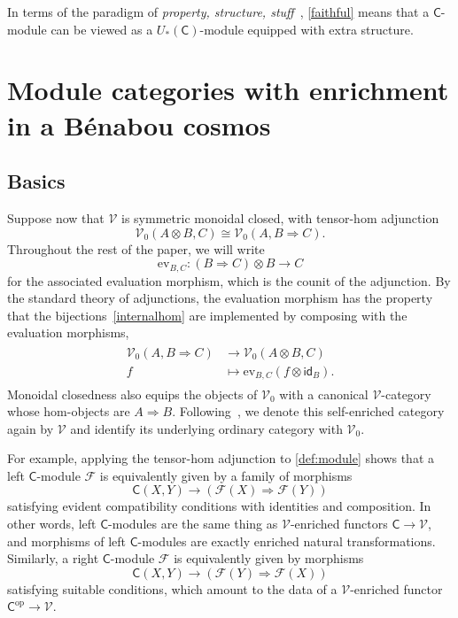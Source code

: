 \documentclass[11pt,onecolumn]{article}
\newcommand{\id}{\mathsf{id}}
\newcommand{\ev}{\mathrm{ev}}
\newcommand{\cV}{\mathscr{V}}
\newcommand{\cC}{\mathsf{C}}
\newcommand{\op}{\mathrm{op}}
\theoremstyle{plain}
\theoremstyle{remark}
\theoremstyle{definition}
\begin{document}
In terms of the paradigm of \emph{property, structure, stuff}~\cite[Section~2.4]{BS},
\cref{faithful} means that a $\cC$-module can be viewed as a $U_*(\cC)$-module equipped with extra structure.

\section{Module categories with enrichment in a B\'enabou cosmos}
\label{sec:cosmos_modules}

\subsection{Basics}
\label{rem:enriched_functor_category}

Suppose now that $\cV$ is symmetric monoidal closed, with tensor-hom adjunction
\begin{equation}
	\label{internalhom}
	\cV_0(A \otimes B, C) \cong \cV_0(A, B \Rightarrow C).
\end{equation}
Throughout the rest of the paper, we will write
\[
	\ev_{B, C} : (B \Rightarrow C) \otimes B \longrightarrow C
\]
for the associated evaluation morphism, which is the counit of the adjunction.
By the standard theory of adjunctions,
the evaluation morphism has the property that the bijections~\eqref{internalhom} are implemented by composing with the evaluation morphisms,
\begin{align}
	\label{internalhom_explicit}
	\begin{split}
		\cV_0(A, B \Rightarrow C) & \longrightarrow \cV_0(A \otimes B, C) \\
		f & \longmapsto \ev_{B,C} (f \otimes \id_B).
	\end{split}
\end{align}
Monoidal closedness also equips the objects of $\cV_0$ with a canonical $\cV$-category whose hom-objects are $A \Rightarrow B$.
Following~\cite[\S 1.6]{Kelly}, we denote this self-enriched category again by $\cV$ and identify its underlying ordinary category with $\cV_0$.

For example, applying the tensor-hom adjunction to \cref{def:module} shows that a left $\cC$-module $\mathcal{F}$ is equivalently given by a family of morphisms
\[
	\cC(X, Y) \longrightarrow \left( \mathcal{F}(X) \Rightarrow \mathcal{F}(Y) \right)
\]
satisfying evident compatibility conditions with identities and composition.
In other words, left $\cC$-modules are the same thing as $\cV$-enriched functors $\cC \to \cV$,
and morphisms of left $\cC$-modules are exactly enriched natural transformations.
Similarly, a right $\cC$-module $\mathcal{F}$ is equivalently given by morphisms
\[
	\cC(X, Y) \longrightarrow \left( \mathcal{F}(Y) \Rightarrow \mathcal{F}(X) \right)
\]
satisfying suitable conditions,
which amount to the data of a $\cV$-enriched functor $\cC^\op \longrightarrow \cV$.
\end{document}
